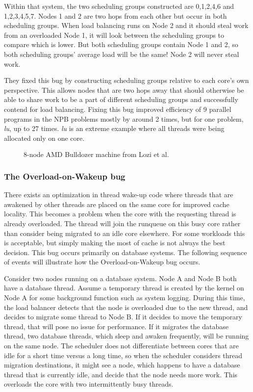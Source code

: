 \documentclass{sig-alternate}
\begin{document}
Within that system, the two scheduling groups constructed are {0,1,2,4,6} and {1,2,3,4,5,7}. Nodes 1 and 2 are two hops from each other but occur in both scheduling groups. When load balancing runs on Node 2 and it should steal work from an overloaded Node 1, it will look between the scheduling groups to compare which is lower. But both scheduling groups contain Node 1 and 2, so both scheduling groups' average load will be the same! Node 2 will never steal work.~\cite{Lozi:2016}

They fixed this bug by constructing scheduling groups relative to each core's own perspective. This allows nodes that are two hops away that should otherwise be able to share work to be a part of different scheduling groups and successfully contend for load balancing. Fixing this bug improved efficiency of 9 parallel programs in the NPB problems mostly by around 2 times, but for one problem, \textit{lu}, up to 27 times. \textit{lu} is an extreme example where all threads were being allocated only on one core.~\cite{Lozi:2016}

\begin{figure}
\centering
{}
\caption{8-node AMD Bulldozer machine from Lozi et al.~\cite{Lozi:2016}}
\label{fig:cfs_schedgroups}
\end{figure}

\subsubsection{The Overload-on-Wakeup bug}
\label{sec:cfsfault_overload}

There exists an optimization in thread wake-up code where threads that are awakened by other threads are placed on the same core for improved cache locality. This becomes a problem when the core with the requesting thread is already overloaded. The thread will join the runqueue on this busy core rather than consider being migrated to an idle core elsewhere. For some workloads this is acceptable, but simply making the most of cache is not always the best decision. This bug occurs primarily on database systems. The following sequence of events will illustrate how the Overload-on-Wakeup bug occurs.~\cite{Lozi:2016}

Consider two nodes running on a database system. Node A and Node B both have a database thread. Assume a temporary thread is created by the kernel on Node A for some background function such as system logging. During this time, the load balancer detects that the node is overloaded due to the new thread, and decides to migrate some thread to Node B. If it decides to move the temporary thread, that will pose no issue for performance. If it migrates the database thread, two database threads, which sleep and awaken frequently, will be running on the same node. The scheduler does not differentiate between cores that are idle for a short time versus a long time, so when the scheduler considers thread migration destinations, it might see a node, which happens to have a database thread that is currently idle, and decide that the node needs more work. This overloads the core with two intermittently busy threads.~\cite{Lozi:2016}
\end{document}
